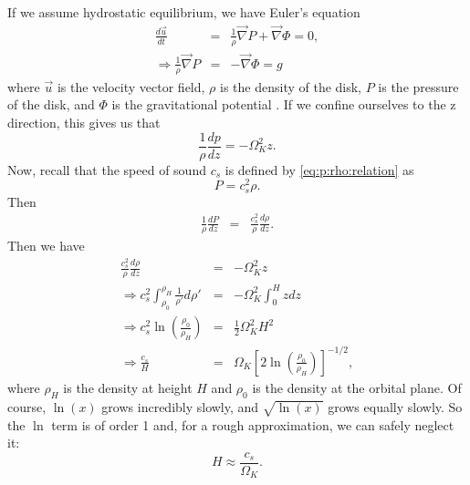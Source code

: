 \documentclass[]{article}
\newcommand{\myvec}[1]{\vec{#1}} %
\begin{document}
If we assume hydrostatic equilibrium, we have Euler's equation
\begin{eqnarray}
  \label{eq:euler}
  \frac{d\vec{u}}{dt} &=& \frac{1}{\rho}\myvec{\nabla} P + \myvec{\nabla}\Phi = 0,\\
  \Rightarrow \frac{1}{\rho}{\myvec{\nabla} P} &=& -\myvec{\nabla}\Phi = g
\end{eqnarray}
where $\vec{u}$ is the velocity vector field, $\rho$ is the density of
the disk, $P$ is the pressure of the disk, and $\Phi$ is the
gravitational potential \cite{Melia,Thompson}. If we confine ourselves
to the z direction, this gives us that
\begin{equation}
  \label{eq:vertical:hydrostatic}
  \frac{1}{\rho}\frac{dp}{dz} = -\Omega_K^2 z.
\end{equation}
Now, recall that the speed of sound $c_s$ is defined by \eqref{eq:p:rho:relation} as
\begin{equation}
  \label{eq:def:cs}
  P = c_s^2 \rho.
\end{equation}
Then
\begin{eqnarray}
  \label{eq:hydrostatic:lhs}
  \frac{1}{\rho}\frac{dP}{dz} &=& \frac{c_s^2}{\rho}\frac{d\rho}{dz}.
\end{eqnarray}
Then we have 
\begin{eqnarray}
  \label{eq:hydrostatic:solving}
  \frac{c_s^2}{\rho}\frac{d\rho}{dz} &=& -\Omega_K^2 z\\
  \Rightarrow c_s^2 \int_{\rho_0}^{\rho_H} \frac{1}{\rho'}d\rho' &=& -\Omega_K^2 \int_0^H z dz\\
  \Rightarrow c_s^2\ln\left(\frac{\rho_0}{\rho_H}\right) &=& \frac{1}{2}\Omega_K^2 H^2\\
  \Rightarrow \frac{c_s}{H} &=& \Omega_K \left[2\ln\left(\frac{\rho_0}{\rho_H}\right)\right]^{-1/2},
\end{eqnarray}
where $\rho_H$ is the density at height $H$ and $\rho_0$ is the
density at the orbital plane. Of course, $\ln(x)$ grows incredibly
slowly, and $\sqrt{\ln(x)}$ grows equally slowly. So the $\ln$ term is
of order 1 and, for a rough approximation, we can safely neglect it:
\begin{equation}
  \label{eq:final:cs}
  H \approx \frac{c_s}{\Omega_K}.
\end{equation}

\newpage


\end{document}
